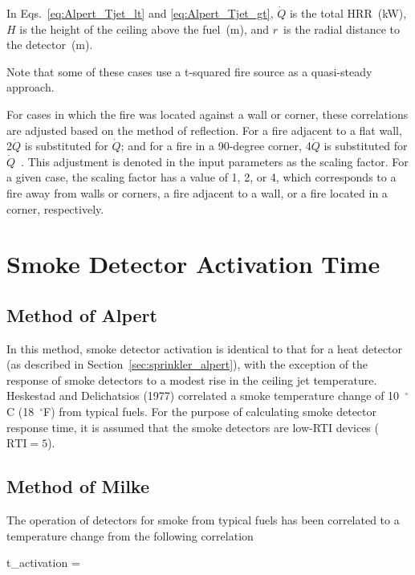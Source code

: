 In Eqs.~\ref{eq:Alpert_Tjet_lt} and \ref{eq:Alpert_Tjet_gt}, $\dot Q$ is the total HRR~(kW), $H$ is the height of the ceiling above the fuel~(m), and $r$~is the radial distance to the detector~(m).

Note that some of these cases use a t-squared fire source as a quasi-steady approach.

For cases in which the fire was located against a wall or corner, these correlations are adjusted based on the method of reflection. For a fire adjacent to a flat wall, 2$\dot Q$ is substituted for $\dot Q$; and for a fire in a 90-degree corner, 4$\dot Q$ is substituted for $\dot Q$~\cite{SFPE:Alpert}. This adjustment is denoted in the input parameters as the scaling factor. For a given case, the scaling factor has a value of 1, 2, or 4, which corresponds to a fire away from walls or corners, a fire adjacent to a wall, or a fire located in a corner, respectively.


\clearpage


\section{Smoke Detector Activation Time}

\subsection{Method of Alpert}

In this method, smoke detector activation is identical to that for a heat detector (as described in Section~\ref{sec:sprinkler_alpert}), with the exception of the response of smoke detectors to a modest rise in the ceiling jet temperature. Heskestad and Delichatsios (1977) correlated a smoke temperature change of 10~$^\circ$C (18~$^\circ$F) from typical fuels. For the purpose of calculating smoke detector response time, it is assumed that the smoke detectors are low-RTI devices ($\textrm{RTI}=5$).


\clearpage


\subsection{Method of Milke}

The operation of detectors for smoke from typical fuels has been correlated to a temperature change from the following correlation

\be
t_{activation} = 
\label{eq:Milke}
\ee

